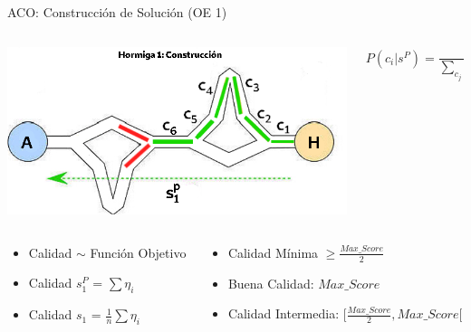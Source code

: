 \begin{frame}{ACO: Construcci\'on de Soluci\'on (OE 1)}
    \begin{columns}
        \begin{column}{0.65\textwidth}
            \centering
            \includegraphics[scale=0.4]{Pictures/ACO-ant-Constr-choices.png}
        \end{column}
        \begin{column}{0.35\textwidth}
        \small
            \begin{equation}
            P(c_{i} | s^{P}) = \frac
            {\tau_{i} ~ \eta_{i}}
            {\sum\limits_{c_{j}\in N(s^p)}{\tau_{j} ~ \eta_{j} } } %
            \label{eq:antProbabilities}
            \end{equation}
        \end{column}
    \end{columns}

    \begin{columns}
        \begin{column}{0.35\textwidth}
            \begin{itemize}
                \item Calidad $\sim$ Funci\'on Objetivo 
                \item Calidad $s^{P}_1$ = $\sum \eta_{i}$
                \item Calidad $s_1$ = $\frac{1}{n}\sum \eta_{i} $
            \end{itemize}
        \end{column}
        \begin{column}{0.65\textwidth}
            \begin{itemize}%
                \item Calidad M\'inima $\geq \frac{Max\_Score}{2}$
                \item Buena Calidad: $Max\_Score$
                \item Calidad Intermedia: $[\frac{Max\_Score}{2}, Max\_Score[$
            \end{itemize}
        \end{column}
    \end{columns}
\end{frame}

